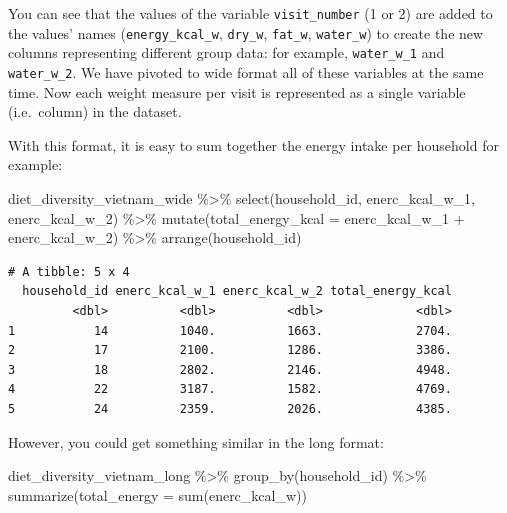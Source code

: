 \documentclass[
  letterpaper,
  DIV=11,
  numbers=noendperiod]{scrreprt}
\newenvironment{Shaded}{\begin{snugshade}}{\end{snugshade}}
\newcommand{\AttributeTok}[1]{\textcolor[rgb]{0.40,0.45,0.13}{#1}}
\newcommand{\FunctionTok}[1]{\textcolor[rgb]{0.28,0.35,0.67}{#1}}
\newcommand{\NormalTok}[1]{\textcolor[rgb]{0.00,0.23,0.31}{#1}}
\newcommand{\SpecialCharTok}[1]{\textcolor[rgb]{0.37,0.37,0.37}{#1}}
\begin{document}
You can see that the values of the variable \texttt{visit\_number} (1 or
2) are added to the values' names (\texttt{energy\_kcal\_w},
\texttt{dry\_w}, \texttt{fat\_w}, \texttt{water\_w}) to create the new
columns representing different group data: for example,
\texttt{water\_w\_1} and \texttt{water\_w\_2}. We have pivoted to wide
format all of these variables at the same time. Now each weight measure
per visit is represented as a single variable (i.e.~column) in the
dataset.

With this format, it is easy to sum together the energy intake per
household for example:

\begin{Shaded}
\begin{Highlighting}[]
\NormalTok{diet\_diversity\_vietnam\_wide }\SpecialCharTok{\%\textgreater{}\%}
  \FunctionTok{select}\NormalTok{(household\_id, enerc\_kcal\_w\_1, enerc\_kcal\_w\_2) }\SpecialCharTok{\%\textgreater{}\%}
  \FunctionTok{mutate}\NormalTok{(}\AttributeTok{total\_energy\_kcal =}\NormalTok{ enerc\_kcal\_w\_1 }\SpecialCharTok{+}\NormalTok{ enerc\_kcal\_w\_2) }\SpecialCharTok{\%\textgreater{}\%}
  \FunctionTok{arrange}\NormalTok{(household\_id)}
\end{Highlighting}
\end{Shaded}

\begin{verbatim}
# A tibble: 5 x 4
  household_id enerc_kcal_w_1 enerc_kcal_w_2 total_energy_kcal
         <dbl>          <dbl>          <dbl>             <dbl>
1           14          1040.          1663.             2704.
2           17          2100.          1286.             3386.
3           18          2802.          2146.             4948.
4           22          3187.          1582.             4769.
5           24          2359.          2026.             4385.
\end{verbatim}

However, you could get something similar in the long format:

\begin{Shaded}
\begin{Highlighting}[]
\NormalTok{diet\_diversity\_vietnam\_long }\SpecialCharTok{\%\textgreater{}\%}
  \FunctionTok{group\_by}\NormalTok{(household\_id) }\SpecialCharTok{\%\textgreater{}\%}
  \FunctionTok{summarize}\NormalTok{(}\AttributeTok{total\_energy =} \FunctionTok{sum}\NormalTok{(enerc\_kcal\_w)) }
\end{Highlighting}
\end{Shaded}
\end{document}
